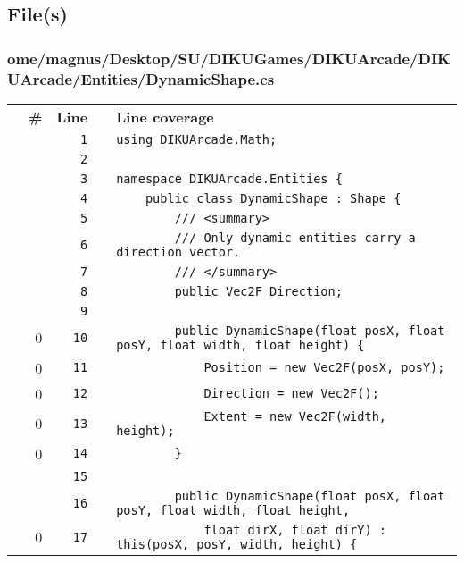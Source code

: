 \documentclass[a4paper,landscape,10pt]{article}
\begin{document}
\subsection{File(s)}
\subsubsection{ome/magnus/Desktop/SU/DIKUGames/DIKUArcade/DIKUArcade/Entities/DynamicShape.cs}
\begin{longtable}[l]{lrrll}
\textbf{} & \textbf{\#} & \textbf{Line} & \textbf{} & \textbf{Line coverage}\\
\cellcolor{gray} &  & \verb~1~ & & \verb~using DIKUArcade.Math;~\\
\cellcolor{gray} &  & \verb~2~ & & \verb~~\\
\cellcolor{gray} &  & \verb~3~ & & \verb~namespace DIKUArcade.Entities {~\\
\cellcolor{gray} &  & \verb~4~ & & \verb~    public class DynamicShape : Shape {~\\
\cellcolor{gray} &  & \verb~5~ & & \verb~        /// <summary>~\\
\cellcolor{gray} &  & \verb~6~ & & \verb~        /// Only dynamic entities carry a direction vector.~\\
\cellcolor{gray} &  & \verb~7~ & & \verb~        /// </summary>~\\
\cellcolor{gray} &  & \verb~8~ & & \verb~        public Vec2F Direction;~\\
\cellcolor{gray} &  & \verb~9~ & & \verb~~\\
\cellcolor{red} & 0 & \verb~10~ & & \verb~        public DynamicShape(float posX, float posY, float width, float height) {~\\
\cellcolor{red} & 0 & \verb~11~ & & \verb~            Position = new Vec2F(posX, posY);~\\
\cellcolor{red} & 0 & \verb~12~ & & \verb~            Direction = new Vec2F();~\\
\cellcolor{red} & 0 & \verb~13~ & & \verb~            Extent = new Vec2F(width, height);~\\
\cellcolor{red} & 0 & \verb~14~ & & \verb~        }~\\
\cellcolor{gray} &  & \verb~15~ & & \verb~~\\
\cellcolor{gray} &  & \verb~16~ & & \verb~        public DynamicShape(float posX, float posY, float width, float height,~\\
\cellcolor{red} & 0 & \verb~17~ & & \verb~            float dirX, float dirY) : this(posX, posY, width, height) {~\\

\end{longtable}
\end{document}
